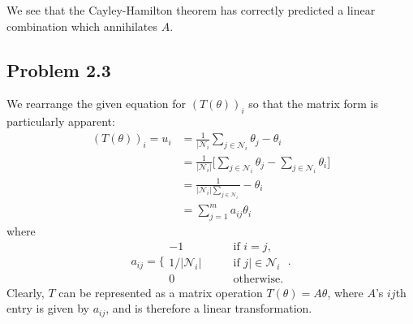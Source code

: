 \documentclass{homework}
\begin{document}
We see that the Cayley-Hamilton theorem has correctly predicted a linear
combination which annihilates $A$.

\newcommand{\Nc}{\mathcal{N}}
\newcommand{\basis}{\mathcal{B}}

\subsection{Problem 2.3}
\begin{letterenum}
    \item We rearrange the given equation for $(T(\theta))_i$ so that
        the matrix form is particularly apparent:
        \begin{align}
            (T(\theta))_i = u_i &= \frac{1}{|\Nc_i} \sum_{j \in \Nc_i} \theta_j - \theta_i \\
                &= \frac{1}{|\Nc_i|} \bigr[ \sum_{j \in \Nc_i} \theta_j - \sum_{j \in \Nc_i} \theta_i] \\
                &= \frac{1}{|\Nc_i| \sum_{j \in \Nc_i}} - \theta_i \\
                &= \sum_{j=1}^m a_{ij}\theta_i
                \label{matrix form}
        \end{align}
        where 
        \begin{equation}
            a_{ij} = \biggl\{
                \begin{array}{ll}
                    -1 &\qquad \text{if }i=j, \\
                    1/|\Nc_i| & \qquad \text{if }j |\in \Nc_i \\
                    0 &\qquad \text{otherwise}.
                \end{array}
            \biggr.
        \end{equation}
        Clearly, $T$ can be represented as a matrix operation $T(\theta) = A \theta$,
        where $A$'s $ij$th entry is given by $a_{ij}$, and is therefore a linear
        transformation.


\end{letterenum}
\end{document}
